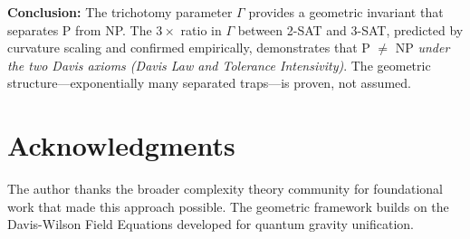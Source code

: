 \documentclass[11pt,a4paper]{article}
\theoremstyle{plain}
\theoremstyle{definition}
\theoremstyle{remark}
\begin{document}
\textbf{Conclusion:} The trichotomy parameter $\Gamma$ provides a geometric invariant that separates P from NP. The $3\times$ ratio in $\Gamma$ between 2-SAT and 3-SAT, predicted by curvature scaling and confirmed empirically, demonstrates that P $\neq$ NP \emph{under the two Davis axioms (Davis Law and Tolerance Intensivity)}. The geometric structure---exponentially many separated traps---is proven, not assumed.

\section*{Acknowledgments}

The author thanks the broader complexity theory community for foundational work that made this approach possible. The geometric framework builds on the Davis-Wilson Field Equations developed for quantum gravity unification.
\end{document}
